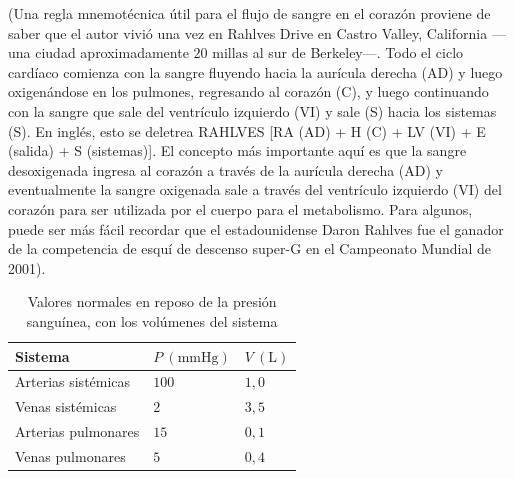 \documentclass[12pt]{book}
\begin{document}
(Una regla mnemotécnica útil para el flujo de sangre en el corazón proviene de saber que el autor vivió una vez en Rahlves Drive en Castro Valley, California ---una ciudad aproximadamente $20\text{ millas}$ al sur de Berkeley---. Todo el ciclo cardíaco comienza con la sangre fluyendo hacia la aurícula derecha (AD) y luego oxigenándose en los pulmones, regresando al corazón (C), y luego continuando con la sangre que sale del ventrículo izquierdo (VI) y sale (S) hacia los sistemas (S). En inglés, esto se deletrea RAHLVES [RA (AD) + H (C) + LV (VI) + E (salida) + S (sistemas)]. El concepto más importante aquí es que la sangre desoxigenada ingresa al corazón a través de la aurícula derecha (AD) y eventualmente la sangre oxigenada sale a través del ventrículo izquierdo (VI) del corazón para ser utilizada por el cuerpo para el metabolismo. Para algunos, puede ser más fácil recordar que el estadounidense Daron Rahlves fue el ganador de la competencia de esquí de descenso super-G en el Campeonato Mundial de 2001).

\begin{table}[htbp]
\centering
\caption{Valores normales en reposo de la presión sanguínea, con los volúmenes del sistema}
\label{tab:81}
\small
\begin{tabularx}{0.8\textwidth}{X >{\centering\arraybackslash}p{3cm} >{\centering\arraybackslash}p{3cm}}
\toprule
\textbf{Sistema} & \textbf{$P\ (\text{mmHg})$} & \textbf{$V\ (\text{L})$} \\
\midrule
Arterias sistémicas & $100$ & $1{,}0$ \\
Venas sistémicas & $2$ & $3{,}5$ \\
Arterias pulmonares & $15$ & $0{,}1$ \\
Venas pulmonares & $5$ & $0{,}4$ \\
\bottomrule
\end{tabularx}
\end{table}
\end{document}
